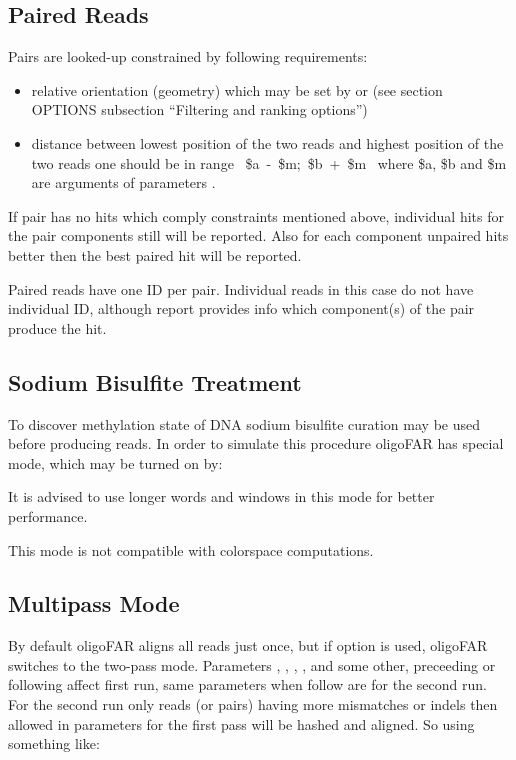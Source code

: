 \documentclass[english,letter]{article}
\begin{document}
\subsection{Paired Reads}

	Pairs are looked-up constrained by following requirements: 
	\begin{itemize}
	\item relative orientation (geometry) which may be set by  
	   or  (see section OPTIONS subsection ``Filtering and ranking options'')
    \item distance between lowest position of the two reads and highest
       position of the two reads one should be in range \Lbr~\$a~-~\$m;~\$b~+~\$m~\Rbr 
       where \$a, \$b and \$m are arguments of parameters  
	   .
	\end{itemize}

    If pair has no hits which comply constraints mentioned above, individual 
    hits for the pair components still will be reported. Also for each
    component unpaired hits better then the best paired hit will be reported.

    Paired reads have one ID per pair. Individual reads in this case do not
    have individual ID, although report provides info which component(s) of 
    the pair produce the hit.

\subsection{Sodium Bisulfite Treatment}
    
	To discover methylation state of DNA sodium bisulfite curation may be
    used before producing reads.  In order to simulate this procedure
    oligoFAR has special mode, which may be turned on by:
    

    It is advised to use longer words and windows in this mode for better
    performance. 
    
    This mode is not compatible with colorspace computations.

\subsection{Multipass Mode}
   
   By default oligoFAR aligns all reads just once, but if option  is 
    used, oligoFAR switches to the two-pass mode. Parameters , , , , 
    and some other, preceeding  or following  affect first run, same 
    parameters when follow  are for the second run.  For the second run 
    only reads (or pairs) having more mismatches or indels then allowed in 
    parameters for the first pass will be hashed and aligned. So using something 
    like:
\end{document}
